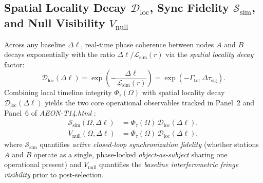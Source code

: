 \documentclass[11pt,a4paper]{article}
\begin{document}
\subsection{Spatial Locality Decay $\mathcal{D}_{\mathrm{loc}}$, Sync Fidelity $\mathcal{S}_{\mathrm{sim}}$, and Null Visibility $V_{\mathrm{null}}$}

Across any baseline $\Delta\ell$, real-time phase coherence between nodes $A$ and $B$ decays exponentially with the ratio $\Delta\ell / \mathcal{L}_{\mathrm{sim}}(r)$ via the \emph{spatial locality decay} factor:
\begin{equation}
\mathcal{D}_{\mathrm{loc}}(\Delta\ell) = \exp\!\left(-\frac{\Delta\ell}{\mathcal{L}_{\mathrm{sim}}(r)}\right) = \exp\!\left(-\Gamma_{\mathrm{tot}}\,\Delta\tau_{\mathrm{sig}}\right).
\label{eq:dloc}
\end{equation}
Combining local timeline integrity $\Phi_\tau(\Omega)$ with spatial locality decay $\mathcal{D}_{\mathrm{loc}}(\Delta\ell)$ yields the two core operational observables tracked in Panel~2 and Panel~6 of \emph{AEON-T14.html} \cite{damasio2026observatory}:
\begin{align}
\mathcal{S}_{\mathrm{sim}}(\Omega, \Delta\ell) &= \Phi_\tau(\Omega)\,\mathcal{D}_{\mathrm{loc}}(\Delta\ell), \label{eq:ssim}\\
V_{\mathrm{null}}(\Omega, \Delta\ell) &= \Phi_\tau(\Omega)\,\mathcal{D}_{\mathrm{loc}}(\Delta\ell), \label{eq:vnull}
\end{align}
where $\mathcal{S}_{\mathrm{sim}}$ quantifies \emph{active closed-loop synchronization fidelity} (whether stations $A$ and $B$ operate as a single, phase-locked \emph{object-as-subject} sharing one operational present) and $V_{\mathrm{null}}$ quantifies the \emph{baseline interferometric fringe visibility} prior to post-selection.
\end{document}
